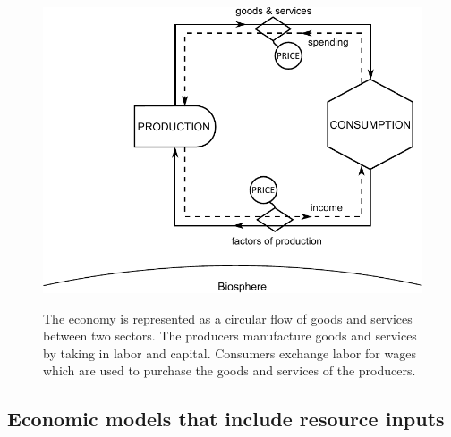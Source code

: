 \begin{figure}[!ht]
\centering\
\includegraphics[width=\linewidth]{Part_0/Chapter_Introduction/images/Perpetual_motion_1.pdf}
\caption[The traditional economic model of the economy]{The economy 
is represented as a circular flow of goods and services between two sectors. 
The producers manufacture goods and services 
by taking in labor and capital. 
Consumers exchange labor for wages 
which are used to purchase 
the goods and services of the producers.}
\label{fig:perp_motion_1}
\end{figure}

\subsection{Economic models that include resource inputs}
\label{sec:metaphor_resource}

